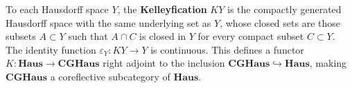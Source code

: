 To each Hausdorff space $Y$, the \textbf{Kelleyfication} $KY$ is the compactly generated Hausdorff space with the same underlying set as $Y$, whose closed sets are those subsets $A \subset Y$ such that $A \cap C$ is closed in $Y$ for every compact subset $C \subset Y$. The identity function $\varepsilon_Y: KY \to Y$ is continuous. This defines a functor $K: \mathbf{Haus} \to \mathbf{CGHaus}$ right adjoint to the inclusion $\mathbf{CGHaus} \hookrightarrow \mathbf{Haus}$, making $\mathbf{CGHaus}$ a coreflective subcategory of $\mathbf{Haus}$.
